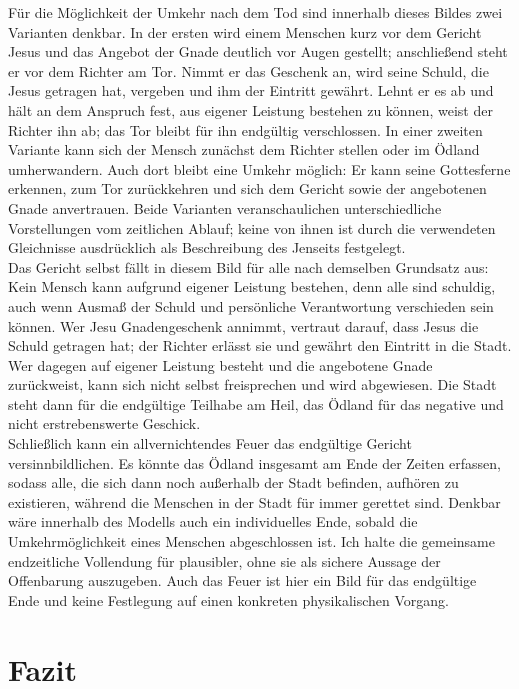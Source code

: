 Für die Möglichkeit der Umkehr nach dem Tod sind innerhalb dieses Bildes zwei Varianten denkbar. In der ersten wird einem Menschen kurz vor dem Gericht Jesus und das Angebot der Gnade deutlich vor Augen gestellt; anschließend steht er vor dem Richter am Tor. Nimmt er das Geschenk an, wird seine Schuld, die Jesus getragen hat, vergeben und ihm der Eintritt gewährt. Lehnt er es ab und hält an dem Anspruch fest, aus eigener Leistung bestehen zu können, weist der Richter ihn ab; das Tor bleibt für ihn endgültig verschlossen. In einer zweiten Variante kann sich der Mensch zunächst dem Richter stellen oder im Ödland umherwandern. Auch dort bleibt eine Umkehr möglich: Er kann seine Gottesferne erkennen, zum Tor zurückkehren und sich dem Gericht sowie der angebotenen Gnade anvertrauen. Beide Varianten veranschaulichen unterschiedliche Vorstellungen vom zeitlichen Ablauf; keine von ihnen ist durch die verwendeten Gleichnisse ausdrücklich als Beschreibung des Jenseits festgelegt.
\\

Das Gericht selbst fällt in diesem Bild für alle nach demselben Grundsatz aus: Kein Mensch kann aufgrund eigener Leistung bestehen, denn alle sind schuldig, auch wenn Ausmaß der Schuld und persönliche Verantwortung verschieden sein können. Wer Jesu Gnadengeschenk annimmt, vertraut darauf, dass Jesus die Schuld getragen hat; der Richter erlässt sie und gewährt den Eintritt in die Stadt. Wer dagegen auf eigener Leistung besteht und die angebotene Gnade zurückweist, kann sich nicht selbst freisprechen und wird abgewiesen. Die Stadt steht dann für die endgültige Teilhabe am Heil, das Ödland für das negative und nicht erstrebenswerte Geschick.
\\

Schließlich kann ein allvernichtendes Feuer das endgültige Gericht versinnbildlichen. Es könnte das Ödland insgesamt am Ende der Zeiten erfassen, sodass alle, die sich dann noch außerhalb der Stadt befinden, aufhören zu existieren, während die Menschen in der Stadt für immer gerettet sind. Denkbar wäre innerhalb des Modells auch ein individuelles Ende, sobald die Umkehrmöglichkeit eines Menschen abgeschlossen ist. Ich halte die gemeinsame endzeitliche Vollendung für plausibler, ohne sie als sichere Aussage der Offenbarung auszugeben. Auch das Feuer ist hier ein Bild für das endgültige Ende und keine Festlegung auf einen konkreten physikalischen Vorgang.

\section{Fazit}

